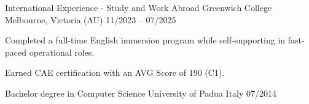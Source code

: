 

\begin{cventries}
\cventry
    {International Experience - Study and Work Abroad}
    {Greenwich College}
    {Melbourne, Victoria (AU)} 
    {11/2023 -- 07/2025}
    {
      \begin{cvitems} 
        \item Completed a full-time English immersion program while self-supporting in fast-paced operational roles.
        \item Earned CAE certification with an AVG Score of 190 (C1).  
      \end{cvitems}
    }
\hfill \break

  \cventry
    {Bachelor degree in Computer Science} %
    {University of Padua} %
    {Italy} %
    {07/2014} %
    {
    }

\end{cventries}
